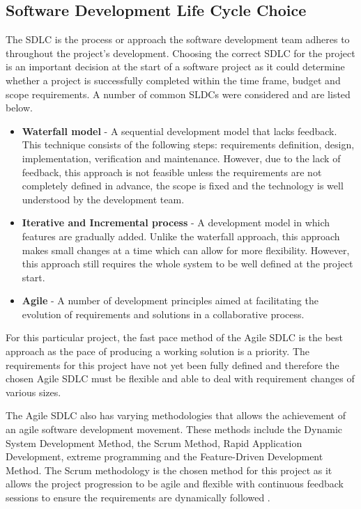\documentclass[12pt,onecolumn]{article}
\begin{document}
	\subsection{Software Development Life Cycle Choice}
	The SDLC is the process or approach the software development team adheres to throughout the project's development. Choosing the correct SDLC for the project is an important decision at the start of a software project as it could determine whether a project is successfully completed within the time frame, budget and scope requirements. A number of common SLDCs were considered and are listed below.
	
	\begin{itemize}
		\item \textbf{Waterfall model} - A sequential development model that lacks feedback. This technique consists of the following steps: requirements definition, design, implementation, verification and maintenance. However, due to the lack of feedback, this approach is not feasible unless the requirements are not completely defined in advance, the scope is fixed and the technology is well understood by the development team.
		
		\item \textbf{Iterative and Incremental process} - A development model in which features are gradually added. Unlike the waterfall approach, this approach makes small changes at a time which can allow for more flexibility. However, this approach still requires the whole system to be well defined at the project start.
		
		\item \textbf{Agile} - A number of development principles aimed at facilitating the evolution of requirements and solutions in a collaborative process.
		
	\end{itemize}
	
	For this particular project, the fast pace method of the Agile SDLC is the best approach as the pace of producing a working solution is a priority. The requirements for this project have not yet been fully defined and therefore the chosen Agile SDLC must be flexible and able to deal with requirement changes of various sizes.
	
	The Agile SDLC also has varying methodologies that allows the achievement of an agile software development movement. These methods include the Dynamic System Development Method, the Scrum Method, Rapid Application Development, extreme programming and the Feature-Driven Development Method. The Scrum methodology is the chosen method for this project as it allows the project progression to be agile and flexible with continuous feedback sessions to ensure the requirements are dynamically followed \cite{Kinsey}.
	
\end{document}
